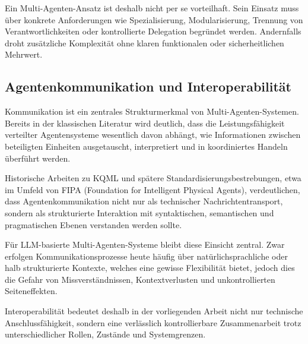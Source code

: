 Ein Multi-Agenten-Ansatz ist deshalb nicht per se vorteilhaft. \cite{jennings_roadmap_1998, yan_beyond_2025, khan_beyond_2026} Sein Einsatz muss über konkrete Anforderungen wie Spezialisierung, Modularisierung, Trennung von Verantwortlichkeiten oder kontrollierte Delegation begründet werden. \cite{jennings_roadmap_1998,wooldridge_intelligent_1995,xue_all--one_2024} Andernfalls droht zusätzliche Komplexität ohne klaren funktionalen oder sicherheitlichen Mehrwert. \cite{wong_adding_2000,yan_beyond_2025,khan_beyond_2026, raza_trism_2026}

\subsection{Agentenkommunikation und Interoperabilität}

Kommunikation ist ein zentrales Strukturmerkmal von Multi-Agenten-Systemen. \cite{russell_artificial_2022,chalupsky_overview_1993,jennings_roadmap_1998} Bereits in der klassischen Literatur wird deutlich, dass die Leistungsfähigkeit verteilter Agentensysteme wesentlich davon abhängt, wie Informationen zwischen beteiligten Einheiten ausgetauscht, interpretiert und in koordiniertes Handeln überführt werden. \cite{jennings_roadmap_1998,russell_artificial_2022,botti_agentic_2025}

Historische Arbeiten zu KQML und spätere Standardisierungsbestrebungen, etwa im Umfeld von FIPA (Foundation for Intelligent Physical Agents), verdeutlichen, dass Agentenkommunikation nicht nur als technischer Nachrichtentransport, sondern als strukturierte Interaktion mit syntaktischen, semantischen und pragmatischen Ebenen verstanden werden sollte. \cite{chalupsky_overview_1993, fipa, botti_agentic_2025}

Für LLM-basierte Multi-Agenten-Systeme bleibt diese Einsicht zentral. \cite{wang_large_2026, yan_beyond_2025} Zwar erfolgen Kommunikationsprozesse heute häufig über natürlichsprachliche oder halb strukturierte Kontexte, welches eine gewisse Flexibilität bietet, jedoch dies die Gefahr von Missverständnissen, Kontextverlusten und unkontrollierten Seiteneffekten. \cite{yan_beyond_2025,ferrag_prompt_2026}

Interoperabilität bedeutet deshalb in der vorliegenden Arbeit nicht nur technische Anschlussfähigkeit, sondern eine verlässlich kontrollierbare Zusammenarbeit trotz unterschiedlicher Rollen, Zustände und Systemgrenzen. \cite{fipa, chalupsky_overview_1993, anbiaee_security_2026}

\newpage

